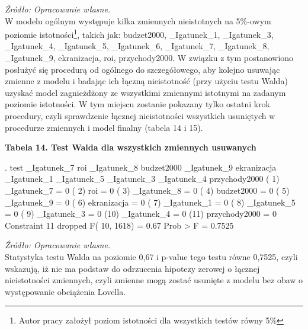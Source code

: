\textit{\footnotesize{Źródło: Opracowanie własne.}} \\	


W modelu ogólnym występuje kilka zmiennych nieistotnych na 5\%-owym poziomie istotności\footnote{Autor pracy założył poziom istotności dla wszystkich testów równy 5\%}, takich jak: budzet2000, _Igatunek_1, _Igatunek_3, _Igatunek_4, _Igatunek_5, _Igatunek_6, _Igatunek_7, _Igatunek_8, _Igatunek_9, ekranizacja, roi, przychody2000. W związku z tym postanowiono posłużyć się procedurą od ogólnego do szczegółowego, aby kolejno usuwając zmienne z modelu i badając ich łączną nieistotność (przy użyciu testu Walda) uzyskać model zagnieżdżony ze wszystkimi zmiennymi istotnymi na zadanym poziomie istotności. W tym miejscu zostanie pokazany tylko ostatni krok procedury, czyli sprawdzenie łącznej nieistotności wszystkich usuniętych w procedurze zmiennych i model finalny (tabela 14 i 15).

\vspace{0.5cm}

\textbf{Tabela 14. Test Walda dla wszystkich zmiennych usuwanych}
\begin{stlog}

. test _Igatunek_7 roi _Igatunek_8 budzet2000 _Igatunek_9 ekranizacja _Igatunek_1  _Igatunek_5 _Igatunek_3
 _Igatunek_4 przychody2000
{\smallskip}
 ( 1)  _Igatunek_7 = 0
 ( 2)  roi = 0
 ( 3)  _Igatunek_8 = 0
 ( 4)  budzet2000 = 0
 ( 5)  _Igatunek_9 = 0
 ( 6)  ekranizacja = 0
 ( 7)  _Igatunek_1 = 0
 ( 8)  _Igatunek_5 = 0
 ( 9)  _Igatunek_3 = 0
 (10)  _Igatunek_4 = 0
 (11)  przychody2000 = 0
       Constraint 11 dropped
{\smallskip}
       F( 10,  1618) =    0.67
            Prob > F =    0.7525

\end{stlog}

\textit{\footnotesize{Źródło: Opracowanie własne.}} \\	

Statystyka testu Walda na poziomie 0,67 i p-value tego testu równe 0,7525, czyli wskazują, iż nie ma podstaw do odrzucenia hipotezy zerowej o łącznej nieistotności zmiennych, czyli zmienne mogą zostać usunięte z modelu bez obaw o występowanie obciążenia Lovella.

 \vspace{0.5cm}

